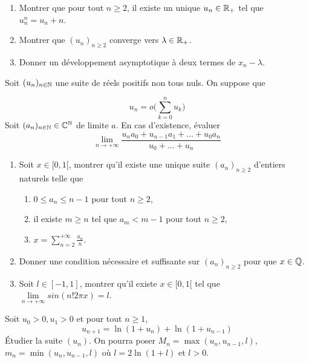 \begin{exercise}
	\phantom{}
	\begin{enumerate}
		\item
		Montrer que pour tout $n\geqslant 2$, il existe un unique $u_{n}\in\mathbb{R}_{+}$
		tel que $u_{n}^{n}=u_{n}+n$.
		\item
		Montrer que $(u_{n})_{n\geqslant 2}$ converge vers $\lambda\in\mathbb{R}_{+}$.
		\item
		Donner un développement asymptotique à deux termes de $x_{n}-\lambda$.
	\end{enumerate}
\end{exercise}

\begin{exercise}
	Soit $(u_{n})_{n\in\mathbb{N}}$ une suite de réels positifs non tous nuls. On suppose
	que
	
	$$u_n=o\Biggl(\sum_{k=0}^{n}u_{k}\Biggr)$$ Soit $(a_{n})_{n\in\mathbb{N}}\in\mathbb{C}^{\mathbb{N}}$
	de limite $a$. En cas d'existence, évaluer
	$$\lim\limits_{n\to+\infty}\frac{u_{n}a_{0}+u_{n-1}a_{1}+\dots+u_{0}a_{n}}{u_{0}+\dots+u_{n}}$$
\end{exercise}

\begin{exercise}
	\phantom{}
	\begin{enumerate}
		\item
		Soit $x\in[0,1[$, montrer qu'il existe une unique suite
		$(a_{n})_{n\geqslant 2}$ d'entiers naturels telle que 
		\begin{enumerate}
			\item
			[(i)] $0\leqslant a_{n}\leqslant n-1$ pour tout $n\geqslant2$,
			\item
			[(ii)] il existe $m\geqslant n$ tel que $a_{m}<m-1$ pour tout
			$n\geqslant2$,
			\item
			[(iii)] $x=\sum_{n=2}^{+\infty}\frac{a_{n}}{n}$.
		\end{enumerate}
		\item
		Donner une condition nécessaire et suffisante sur $(a_{n})_{n\geqslant2}$
		pour que $x\in\mathbb{Q}$.
		\item
		Soit $l\in[-1,1]$, montrer qu'il existe $x\in[0,1[$ tel que
		$\lim\limits_{n\to+\infty}sin(n!2\pi x)=l$.
	\end{enumerate}
\end{exercise}

\begin{exercise}
	Soit $u_0>0,u_1>0$ et pour tout $n\geqslant 1$,
	$$u_{n+1}=\ln(1+u_{n})+\ln(1+u_{n-1})$$ Étudier la suite $(u_{n})$. On pourra
	poser $M_{n}=\max(u_{n},u_{n-1},l)$, $m_{n}=\min(u_{n},u_{n-1},l)$ où
	$l=2\ln(1+l)$ et $l>0$.
\end{exercise}

